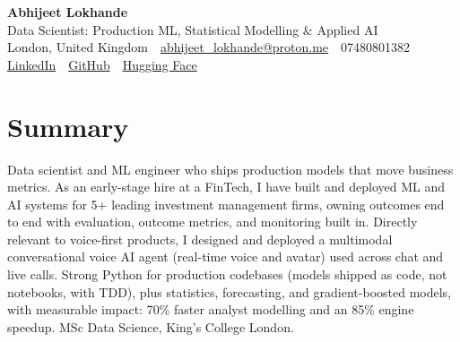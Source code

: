 \documentclass[10pt,a4paper]{article}
\newcommand{\sep}{\,\textcolor{accent!60}{\textbar}\,}
\begin{document}
\begin{center}
  {\fontsize{24}{26}\selectfont\bfseries Abhijeet Lokhande}\\[3pt]
  {\color{accent}\large Data Scientist: Production ML, Statistical Modelling \& Applied AI}\\[5pt]
  {\small
    London, United Kingdom \sep
    \href{mailto:abhijeet_lokhande@proton.me}{abhijeet\_lokhande@proton.me} \sep
    07480801382 \\[2pt]
    \href{https://www.linkedin.com/in/ablds/}{LinkedIn} \sep
    \href{https://github.com/abhijeetscode}{GitHub} \sep
    \href{https://huggingface.co/ab-ai}{Hugging Face}
  }
\end{center}
\vspace{2pt}

\section{Summary}
Data scientist and ML engineer who ships production models that move business metrics. As an early-stage hire at a FinTech, I have built and deployed ML and AI systems for 5+ leading investment management firms, owning outcomes end to end with evaluation, outcome metrics, and monitoring built in. Directly relevant to voice-first products, I designed and deployed a multimodal conversational voice AI agent (real-time voice and avatar) used across chat and live calls. Strong Python for production codebases (models shipped as code, not notebooks, with TDD), plus statistics, forecasting, and gradient-boosted models, with measurable impact: 70\% faster analyst modelling and an 85\% engine speedup. MSc Data Science, King's College London.

\end{document}
